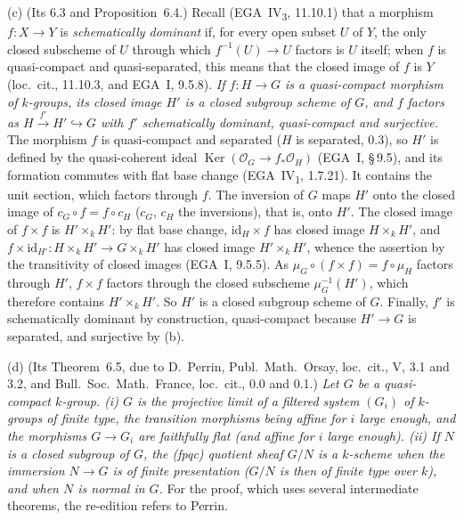 (c) (Its 6.3 and Proposition~6.4.) Recall (EGA~IV\textsubscript{3}, 11.10.1) that a morphism
\(f\colon X\to Y\) is \emph{schematically dominant} if, for every open subset \(U\) of \(Y\), the only
closed subscheme of \(U\) through which \(f^{-1}(U)\to U\) factors is \(U\) itself; when \(f\) is
quasi-compact and quasi-separated, this means that the closed image of \(f\) is \(Y\) (loc.\ cit.,
11.10.3, and EGA~I, 9.5.8).
\label{prop:sga3-VIA-6.4}%
\emph{If \(f\colon H\to G\) is a quasi-compact morphism of \(k\)-groups, its closed image \(H'\) is a
closed subgroup scheme of \(G\), and \(f\) factors as \(H\xrightarrow{\;f'\;}H'\hookrightarrow G\) with
\(f'\) schematically dominant, quasi-compact and surjective.} The morphism \(f\) is quasi-compact and
separated (\(H\) is separated, 0.3), so \(H'\) is defined by the quasi-coherent ideal
\(\operatorname{Ker}(\mathcal O_G\to f_*\mathcal O_H)\) (EGA~I, \S\,9.5), and its formation commutes
with flat base change (EGA~IV\textsubscript{1}, 1.7.21). It contains the unit section, which factors
through \(f\). The inversion of \(G\) maps \(H'\) onto the closed image of \(c_G\circ f=f\circ c_H\)
(\(c_G\), \(c_H\) the inversions), that is, onto \(H'\). The closed image of \(f\times f\) is
\(H'\times_kH'\): by flat base change, \(\mathrm{id}_H\times f\) has closed image \(H\times_kH'\), and
\(f\times\mathrm{id}_{H'}\colon H\times_kH'\to G\times_kH'\) has closed image \(H'\times_kH'\), whence
the assertion by the transitivity of closed images (EGA~I, 9.5.5). As
\(\mu_G\circ(f\times f)=f\circ\mu_H\) factors through \(H'\), \(f\times f\) factors through the closed
subscheme \(\mu_G^{-1}(H')\), which therefore contains \(H'\times_kH'\). So \(H'\) is a closed subgroup
scheme of \(G\). Finally, \(f'\) is schematically dominant by construction, quasi-compact because
\(H'\to G\) is separated, and surjective by (b).

(d) (Its Theorem~6.5, due to D.~Perrin, Publ.\ Math.\ Orsay, loc.\ cit., V, 3.1 and 3.2, and
Bull.\ Soc.\ Math.\ France, loc.\ cit., 0.0 and 0.1.) \emph{Let \(G\) be a quasi-compact \(k\)-group.
\textup{(i)} \(G\) is the projective limit of a filtered system \((G_i)\) of \(k\)-groups of finite
type, the transition morphisms being affine for \(i\) large enough, and the morphisms \(G\to G_i\) are
faithfully flat \textup{(}and affine for \(i\) large enough\textup{)}. \textup{(ii)} If \(N\) is a closed
subgroup of \(G\), the \textup{(}fpqc\textup{)} quotient sheaf \(G/N\) is a \(k\)-scheme when the
immersion \(N\to G\) is of finite presentation \textup{(}\(G/N\) is then of finite type over \(k\)\textup{)},
and when \(N\) is normal in \(G\).} For the proof, which uses several intermediate theorems, the
re-edition refers to Perrin.

